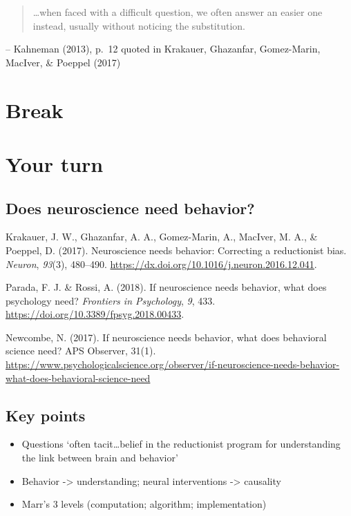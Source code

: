 \documentclass[
  letterpaper,
  DIV=11,
  numbers=noendperiod]{scrartcl}
\providecommand{\tightlist}{%
  \setlength{\itemsep}{0pt}\setlength{\parskip}{0pt}}
\begin{document}
\begin{quote}
\ldots when faced with a difficult question, we often answer an easier
one instead, usually without noticing the substitution.
\end{quote}

-- Kahneman (2013), p.~12 quoted in Krakauer, Ghazanfar, Gomez-Marin,
MacIver, \& Poeppel (2017)

\section{Break}\label{break}

\section{Your turn}\label{your-turn}

\subsection{Does neuroscience need
behavior?}\label{does-neuroscience-need-behavior}

Krakauer, J. W., Ghazanfar, A. A., Gomez-Marin, A., MacIver, M. A., \&
Poeppel, D. (2017). Neuroscience needs behavior: Correcting a
reductionist bias. \emph{Neuron}, \emph{93}(3), 480--490.
\url{https://dx.doi.org/10.1016/j.neuron.2016.12.041}.

Parada, F. J. \& Rossi, A. (2018). If neuroscience needs behavior, what
does psychology need? \emph{Frontiers in Psychology}, \emph{9}, 433.
\url{https://doi.org/10.3389/fpsyg.2018.00433}.

Newcombe, N. (2017). If neuroscience needs behavior, what does
behavioral science need? APS Observer, 31(1).
\url{https://www.psychologicalscience.org/observer/if-neuroscience-needs-behavior-what-does-behavioral-science-need}

\subsection{Key points}\label{key-points}

\begin{itemize}
\tightlist
\item
  Questions `often tacit\ldots belief in the reductionist program for
  understanding the link between brain and behavior'
\item
  Behavior -\textgreater{} understanding; neural interventions
  -\textgreater{} causality
\item
  Marr's 3 levels (computation; algorithm; implementation)
\end{itemize}
\end{document}
